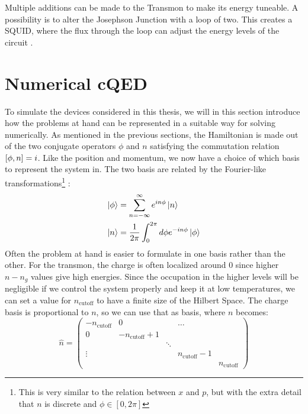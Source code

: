 Multiple additions can be made to the Transmon to make its energy tuneable. A possibility is to alter the Josephson Junction with a loop of two. This creates a SQUID, where the flux through the loop can adjust the energy levels of the circuit \cite{blais_circuit_2021}. 



\section{Numerical cQED}
To simulate the devices considered in this thesis, we will in this section introduce how the problems at hand can be represented in a suitable way for solving numerically. As mentioned in the previous sections, the Hamiltonian is made out of the two conjugate operators $\phi$ and $n$ satisfying the commutation relation $\comm{\phi}{n} = i$. Like the position and momentum, we now have a choice of which basis to represent the system in. The two basis are related by the Fourier-like transformations\footnote{This is very similar to the relation between $x$ and $p$, but with the extra detail that $n$ is discrete and $\phi\in[0, 2\pi]$}  \cite{langford_circuit_2013}:
\begin{align}
    \ket{\phi} &= \sum_{n=-\infty}^\infty e^{in\phi}\ket{n} \\
    \ket{n} &= \frac{1}{2\pi} \int_0^{2\pi}d\phi e^{-in\phi}\ket{\phi}
\end{align}
Often the problem at hand is easier to formulate in one basis rather than the other. For the transmon, the charge is often localized around $0$ since higher $n- n_g$ values give high energies. Since the occupation in the higher levels will be negligible if we control the system properly and keep it at low temperatures, we can set a value for $n_{\text{cutoff}}$ to have a finite size of the Hilbert Space. The charge basis is proportional to $n$, so we can use that as basis, where $n$ becomes:
\begin{equation}
    \hat{n} = \begin{pmatrix}
-n_{\text{cutoff}} & 0 &  & \ldots &  \\
0 & -n_{\text{cutoff}}+1 &  &  &  \\
 &  & \ddots &  &  \\
\vdots &  &  & n_{\text{cutoff}}-1 &  \\
 &  &  &  & n_{\text{cutoff}} 
\end{pmatrix}
\end{equation} 
